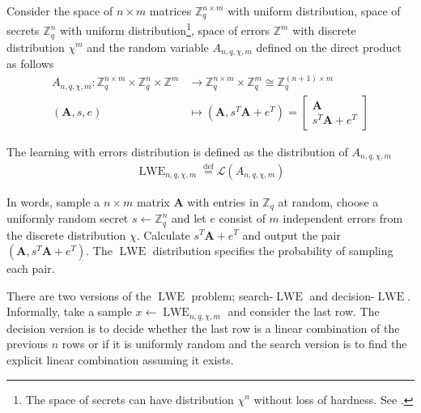 Consider the space of $n \times m$ matrices $\mathbb{Z}_q^{n \times m}$ with uniform distribution, space of secrets $\mathbb{Z}_q^{n}$ with uniform distribution\footnote{The space of secrets can have distribution $\chi^n$ without loss of hardness. See \cite{Applebaum}.}, space of errors $\mathbb{Z}^{m}$ with discrete distribution $\chi^m$ and the random variable $A_{n, q, \chi, m}$ defined on the direct product as follows
\begin{equation*}
\begin{aligned}
    A_{n, q, \chi, m} \colon \mathbb{Z}_q^{n \times m} \times \mathbb{Z}_q^n \times \mathbb{Z}^m &\to \mathbb{Z}_q^{n \times m} \times \mathbb{Z}_q^m \cong \mathbb{Z}_q^{(n+1) \times m}\\
    (\textbf{A},s,e) &\mapsto (\textbf{A}, s^T\textbf{A}+e^T) = \left[\begin{array}{c} \textbf{A} \\ s^T\textbf{A}+e^T \end{array}\right]
\end{aligned}
\end{equation*}
\begin{definition}
    The learning with errors distribution is defined as the distribution of $A_{n, q, \chi, m}$
    \begin{equation*}
    \begin{aligned}
        \operatorname{LWE}_{n, q, \chi, m} \stackrel{\mathrm{def}}{=} \mathcal{L}(A_{n, q, \chi, m})
    \end{aligned}
    \end{equation*}
\end{definition}

In words, sample a $n \times m$ matrix $\textbf{A}$ with entries in $\mathbb{Z}_q$ at random, choose a uniformly random secret $s \leftarrow \mathbb{Z}_q^n$ and let $e$ consist of $m$ independent errors from the discrete distribution $\chi$. Calculate $s^T\textbf{A}+e^T$ and output the pair $(\textbf{A},s^T\textbf{A}+e^T)$. The $\operatorname{LWE}$ distribution specifies the probability of sampling each pair.

There are two versions of the $\operatorname{LWE}$ problem; search-$\operatorname{LWE}$ and decision-$\operatorname{LWE}$.
Informally, take a sample $x \leftarrow \operatorname{LWE}_{n, q, \chi, m}$ and consider the last row. The decision version is to decide whether the last row is a linear combination of the previous $n$ rows or if it is uniformly random and the search version is to find the explicit linear combination assuming it exists.

